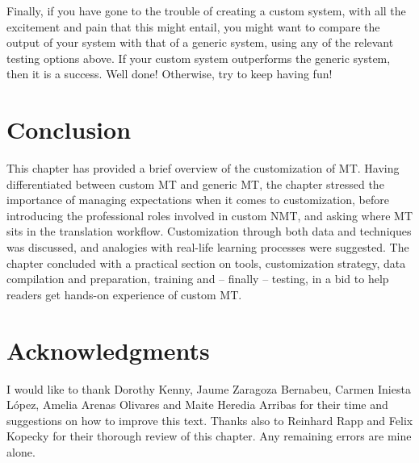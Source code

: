 \documentclass[output=paper]{langscibook}
\begin{document}
Finally, if you have gone to the trouble of creating a custom system, with all the excitement and pain that this might entail, you might want to compare the output of your system with that of a generic system, using any of the relevant testing options above. If your custom system outperforms the generic system, then it is a success. Well done! Otherwise, try to keep having fun!

\section{Conclusion}

This chapter has provided a brief overview of the customization of MT. Having differentiated between custom MT and generic MT, the chapter stressed the importance of managing expectations when it comes to customization, before introducing the professional roles involved in custom NMT, and asking where MT sits in the translation workflow. Customization through both data and techniques was discussed, and analogies with real-life learning processes were suggested. The chapter concluded with a  practical section on tools, customization strategy, data compilation and preparation, training  and -- finally -- testing, in a bid to help readers get hands-on experience of custom MT. 

\section{Acknowledgments}\largerpage
I would like to thank Dorothy Kenny, Jaume Zaragoza Bernabeu, Carmen Iniesta López, Amelia Arenas Olivares and Maite Heredia Arribas for their time and suggestions on how to improve this text. Thanks also to  Reinhard Rapp and Felix Kopecky for their thorough review of this chapter. Any remaining errors are mine alone. 

\printbibliography[heading=subbibliography,notkeyword=this]
\end{document}

